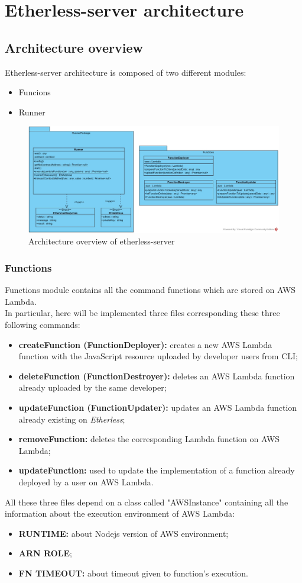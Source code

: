 \section{Etherless-server architecture}
\subsection{Architecture overview}
Etherless-server architecture is composed of two different modules:
\begin{itemize}
	\item Funcions
	\item Runner
\end{itemize}
\begin{figure}[!h]
\centering
	\includegraphics[width=\textwidth]{res/img/etherlessServer.jpg}
	\caption{Architecture overview of etherless-server}
\end{figure}
\subsubsection{Functions}
Functions module contains all the command functions which are stored on AWS Lambda. \\
In particular, here will be implemented three files corresponding these three following commands:
\begin{itemize}
	\item \textbf{createFunction (FunctionDeployer):} creates a new AWS Lambda function with the JavaScript resource uploaded by developer users from CLI\glo;
	\item \textbf{deleteFunction (FunctionDestroyer):} deletes an AWS Lambda function already uploaded by the same developer;
	\item \textbf{updateFunction (FunctionUpdater):} updates an AWS Lambda function already existing on \textit{Etherless};
	\item \textbf{removeFunction:} deletes the corresponding Lambda function on AWS Lambda;
	\item \textbf{updateFunction:} used to update the implementation of a function already deployed by a user on AWS Lambda.
\end{itemize}
All these three files depend on a class called "AWSInstance" containing all the information about the execution environment of AWS Lambda:
\begin{itemize}
	\item \textbf{RUNTIME:} about Nodejs version of AWS environment;
	\item \textbf{ARN ROLE};
	\item \textbf{FN TIMEOUT:} about timeout given to function's execution.
\end{itemize}


